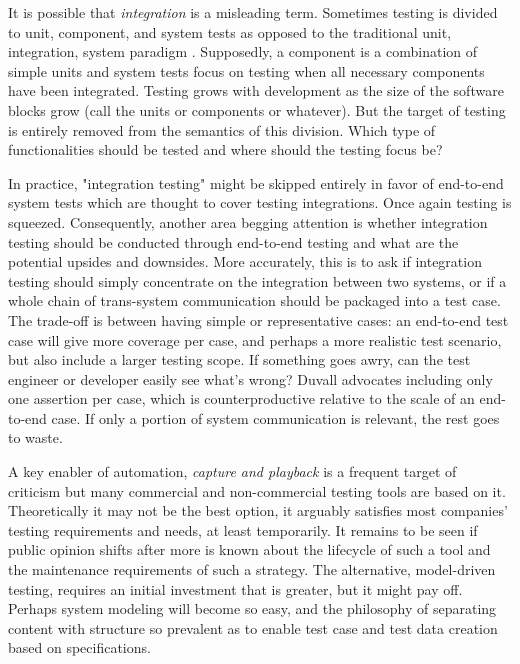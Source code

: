 \documentclass[12pt,a4paper,oneside,pdftex]{report}
\begin{document}
{%
It is possible that \emph{integration} is a misleading term. Sometimes testing is divided to unit, component, and system tests as opposed to the traditional unit, integration, system paradigm \citep{myers1976software, pezze2008software}. Supposedly, a component is a combination of simple units and system tests focus on testing when all necessary components have been integrated. Testing grows with development as the size of the software blocks grow (call the units or components or whatever). But the target of testing is entirely removed from the semantics of this division. Which type of functionalities should be tested and where should the testing focus be?

In practice, "integration testing" might be skipped entirely in favor of end-to-end system tests which are thought to cover testing integrations. Once again testing is squeezed. Consequently, another area begging attention is whether integration testing should be conducted through end-to-end testing and what are the potential upsides and downsides. More accurately, this is to ask if integration testing should simply concentrate on the integration between two systems, or if a whole chain of trans-system communication should be packaged into a test case. The trade-off is between having simple or representative cases: an end-to-end test case will give more coverage per case, and perhaps a more realistic test scenario, but also include a larger testing scope. If something goes awry, can the test engineer or developer easily see what's wrong? Duvall advocates including only one assertion per case, which is counterproductive relative to the scale of an end-to-end case. If only a portion of system communication is relevant, the rest goes to waste.

A key enabler of automation, \emph{capture and playback} is a frequent target of criticism but many commercial and non-commercial testing tools are based on it. Theoretically it may not be the best option, it arguably satisfies most companies' testing requirements and needs, at least temporarily. It remains to be seen if public opinion shifts after more is known about the lifecycle of such a tool and the maintenance requirements of such a strategy. The alternative, model-driven testing, requires an initial investment that is greater, but it might pay off. Perhaps system modeling will become so easy, and the philosophy of separating content with structure so prevalent as to enable test case and test data creation based on specifications.

}
\end{document}
